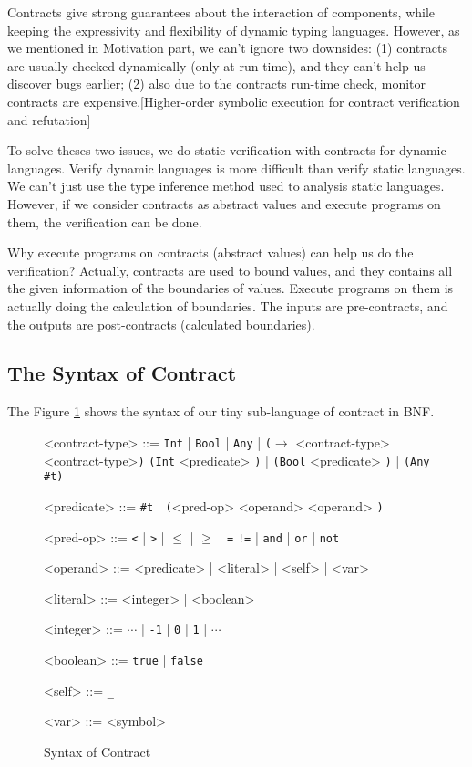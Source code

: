 \documentclass[paper=a4, fontsize=11pt]{scrartcl} %
\numberwithin{equation}{section} %
\numberwithin{figure}{section} %
\numberwithin{table}{section} %
\begin{document}
Contracts give strong guarantees about the interaction of components, while keeping the expressivity and flexibility of dynamic typing languages. However, as we mentioned in Motivation part, we can't ignore two downsides: (1) contracts are usually checked dynamically (only at run-time), and they can't help us discover bugs earlier; (2) also due to the contracts run-time check, monitor contracts are expensive.[Higher-order symbolic execution for contract verification and refutation]

To solve theses two issues, we do static verification with contracts for dynamic languages. Verify dynamic languages is more difficult than verify static languages. We can't just use the type inference method used to analysis static languages. However, if we consider contracts as abstract values and execute programs on them, the verification can be done.

Why execute programs on contracts (abstract values) can help us do the verification? Actually, contracts are used to bound values, and they contains all the given information of the boundaries of values. Execute programs on them is actually doing the calculation of boundaries. The inputs are pre-contracts, and the outputs are post-contracts (calculated boundaries).

\subsection{The Syntax of Contract}
The Figure \ref{figc} shows the syntax of our tiny sub-language of contract in BNF.
\begin{figure}[h!]
\setlength{\grammarparsep}{7pt plus 1pt minus 1pt} %
\setlength{\grammarindent}{8em} %
\begin{grammar}
<contract-type> ::= \texttt{Int} | \texttt{Bool} | \texttt{Any} | \texttt{($\rightarrow$} <contract-type> <contract-type>\texttt{)}
\alt \texttt{(Int} <predicate> \texttt{)} | \texttt{(Bool} <predicate> \texttt{)} | \texttt{(Any \#t)}

<predicate> ::= \texttt{\#t} | \texttt{(}<pred-op> <operand> <operand> \texttt{)}

<pred-op> ::= \texttt{\textless} | \texttt{\textgreater} | \texttt{$\leq$} | \texttt{$\geq$} | \texttt{=}
\alt \texttt{!=} | \texttt{and} | \texttt{or} | \texttt{not}

<operand> ::= <predicate> | <literal> | <self> | <var>


<literal> ::= <integer> | <boolean>

<integer> ::= $\cdots$ | \texttt{-1} | \texttt{0} | \texttt{1} | $\cdots$

<boolean> ::= \texttt{true} | \texttt{false}

<self> ::= \texttt{_}

<var> ::= <symbol>
\end{grammar}
\caption{Syntax of Contract}
\label{figc}
\end{figure}
\end{document}
